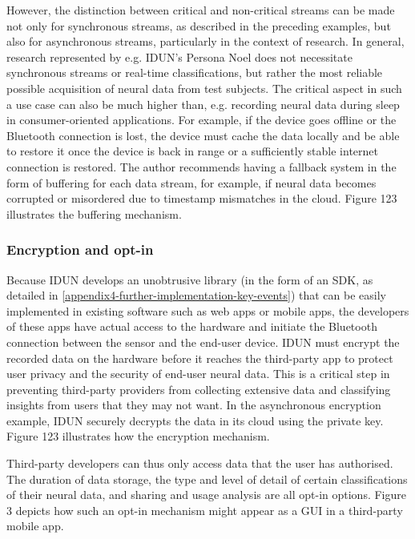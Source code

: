 However, the distinction between critical and non-critical streams can be made not only for synchronous streams, as described in the preceding examples, but also for asynchronous streams, particularly in the context of research. In general, research represented by e.g. IDUN's Persona Noel does not necessitate synchronous streams or real-time classifications, but rather the most reliable possible acquisition of neural data from test subjects. The critical aspect in such a use case can also be much higher than, e.g. recording neural data during sleep in consumer-oriented applications. For example, if the device goes offline or the Bluetooth connection is lost, the device must cache the data locally and be able to restore it once the device is back in range or a sufficiently stable internet connection is restored. The author recommends having a fallback system in the form of buffering for each data stream, for example, if neural data becomes corrupted or misordered due to timestamp mismatches in the cloud. Figure 123 illustrates the buffering mechanism.


\subsubsection{Encryption and opt-in}
\label{chapter5-user-side-opt-in}

Because IDUN develops an unobtrusive library (in the form of an SDK, as detailed in \autoref{appendix4-further-implementation-key-events}) that can be easily implemented in existing software such as web apps or mobile apps, the developers of these apps have actual access to the hardware and initiate the Bluetooth connection between the sensor and the end-user device. IDUN must encrypt the recorded data on the hardware before it reaches the third-party app to protect user privacy and the security of end-user neural data. This is a critical step in preventing third-party providers from collecting extensive data and classifying insights from users that they may not want. In the asynchronous encryption example, IDUN securely decrypts the data in its cloud using the private key. Figure 123 illustrates how the encryption mechanism.


Third-party developers can thus only access data that the user has authorised. The duration of data storage, the type and level of detail of certain classifications of their neural data, and sharing and usage analysis are all opt-in options. Figure 3 depicts how such an opt-in mechanism might appear as a GUI in a third-party mobile app.

